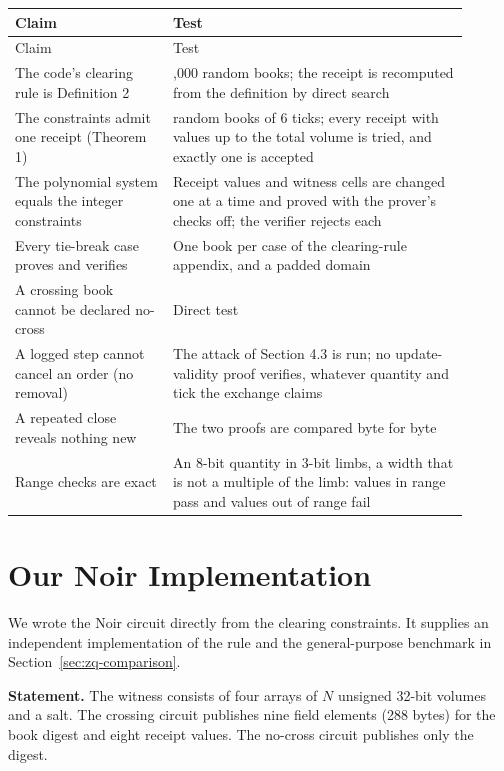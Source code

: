 \begingroup
\setlength{\tabcolsep}{2pt}\small
\begin{longtable}{@{}>{\raggedright\arraybackslash}p{0.3150\linewidth}>{\raggedright\arraybackslash}p{0.5850\linewidth}@{}}
\toprule
Claim & Test \\
\midrule\endfirsthead
\toprule
Claim & Test \\
\midrule\endhead
\bottomrule\endfoot
The code's clearing rule is Definition 2 & 2,000 random books; the receipt is recomputed from the definition by direct search \\
The constraints admit one receipt (Theorem 1) & 300 random books of 6 ticks; every receipt with values up to the total volume is tried, and exactly one is accepted \\
The polynomial system equals the integer constraints & Receipt values and witness cells are changed one at a time and proved with the prover's checks off; the verifier rejects each \\
Every tie-break case proves and verifies & One book per case of the clearing-rule appendix, and a padded domain \\
A crossing book cannot be declared no-cross & Direct test \\
A logged step cannot cancel an order (no removal) & The attack of Section 4.3 is run; no update-validity proof verifies, whatever quantity and tick the exchange claims \\
A repeated close reveals nothing new & The two proofs are compared byte for byte \\
Range checks are exact & An 8-bit quantity in 3-bit limbs, a width that is not a multiple of the limb: values in range pass and values out of range fail \\
\end{longtable}
\endgroup

\section{Our Noir Implementation}
\label{app:zq-noir}

We wrote the Noir circuit directly from the clearing constraints. It supplies an independent implementation of the rule and the general-purpose benchmark in Section~\ref{sec:zq-comparison}.

\textbf{Statement.} The witness consists of four arrays of \(N\) unsigned 32-bit volumes and a salt. The crossing circuit publishes nine field elements (288 bytes) for the book digest and eight receipt values. The no-cross circuit publishes only the digest.

